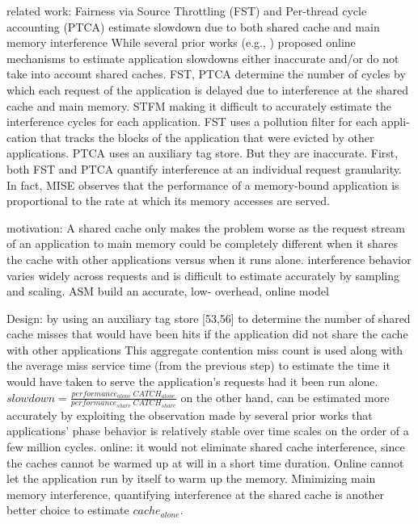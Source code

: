 \documentclass[UTF8]{article}
\begin{document}
related work: Fairness via Source Throttling (FST) \cite{ebrahimi2010fairness}  and Per-thread cycle accounting (PTCA) \cite{du2013per} estimate slowdown due to both shared cache and main memory interference While several prior works (e.g., \cite{ebrahimi2010fairness,du2013per, mutlu2007stall,subramanian2013mise}) proposed online mechanisms to estimate application slowdowns either inaccurate and/or do not take into account shared caches. FST, PTCA determine the number of cycles by which each request of the application is delayed due to interference at the shared cache and main memory.   STFM \cite{mutlu2007stall} making it difficult to accurately estimate the interference cycles for each application. FST uses a pollution filter for each appli- cation that tracks the blocks of the application that were evicted by other applications. PTCA uses an auxiliary tag store. But they are inaccurate. First, both FST and PTCA quantify interference at an individual request granularity.  In fact, MISE \cite{subramanian2013mise} observes that the performance of a memory-bound application is proportional to the rate at which its memory accesses are served.

motivation: A shared cache only makes the problem worse as the request stream of an application to main memory could be completely different when it shares the cache with other applications versus when it runs alone.  interference behavior varies widely across requests and is difficult to estimate accurately by sampling and scaling. ASM build an accurate, low- overhead, online model

Design: by using an auxiliary tag store [53,56] to determine the number of shared cache misses that would have been hits if the application did not share the cache with other applications This aggregate contention miss count is used along with the average miss service time (from the previous step) to estimate the time it would have taken to serve the application’s requests had it been run alone.   $slowdown = \frac{performance_{alone} ~ CATCH_{alone}}{performance_{share} ~ CATCH_{share}}$ on the other hand, can be estimated more accurately by exploiting the observation made by several prior works that applications’ phase behavior is relatively stable over time scales on the order of a few million cycles.   online: it would not eliminate shared cache interference, since the caches cannot be warmed up at will in a short time duration.  Online cannot let the application run by itself to warm up the memory. Minimizing main memory interference, quantifying interference at the shared cache is another better choice to estimate $cache_{alone}$. 
\end{document}

